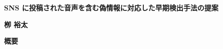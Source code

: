 



\thispagestyle{plain}
\cleardoublepage
%
%

\begin{center}
    \Large
    \textbf{SNS に投稿された音声を含む偽情報に対応した早期検出手法の提案}
        
    \vspace{0.4cm}
    \textbf{栁 裕太}
       
    \vspace{0.9cm}
    \textbf{概要}
   
\end{center}

